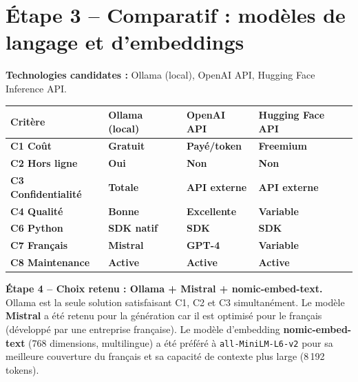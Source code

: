 \documentclass[12pt,a4paper]{report}
\begin{document}
\section{\'{E}tape 3 -- Comparatif : mod\`{e}les de langage et d'embeddings}

\textbf{Technologies candidates :} Ollama (local), OpenAI API, Hugging Face Inference API.

\begin{center}
\renewcommand{\arraystretch}{1.5}
\begin{tabularx}{\linewidth}{>{\bfseries\small}p{2.5cm} X X X}
  \toprule
  \rowcolor{rowblue}
  \textbf{Crit\`{e}re} & \textbf{Ollama (local)} & \textbf{OpenAI API} & \textbf{Hugging Face API} \\
  \midrule
  C1 Co\^{u}t          & \cellcolor{rowgreen}\textbf{Gratuit}     & \cellcolor{rowred}\textbf{Pay\'{e}/token}  & \cellcolor{warnorange!30}\textbf{Freemium} \\
  C2 Hors ligne         & \cellcolor{rowgreen}\textbf{Oui}         & \cellcolor{rowred}\textbf{Non}             & \cellcolor{rowred}\textbf{Non}             \\
  C3 Confidentialit\'{e}& \cellcolor{rowgreen}\textbf{Totale}      & \cellcolor{rowred}\textbf{API externe}     & \cellcolor{rowred}\textbf{API externe}     \\
  C4 Qualit\'{e}        & \cellcolor{warnorange!30}\textbf{Bonne}  & \cellcolor{rowgreen}\textbf{Excellente}    & \cellcolor{warnorange!30}\textbf{Variable} \\
  C6 Python             & \cellcolor{rowgreen}\textbf{SDK natif}   & \cellcolor{rowgreen}\textbf{SDK}           & \cellcolor{rowgreen}\textbf{SDK}           \\
  C7 Fran\c{c}ais       & \cellcolor{rowgreen}\textbf{Mistral}     & \cellcolor{rowgreen}\textbf{GPT-4}         & \cellcolor{warnorange!30}\textbf{Variable} \\
  C8 Maintenance        & \cellcolor{rowgreen}\textbf{Active}      & \cellcolor{rowgreen}\textbf{Active}        & \cellcolor{rowgreen}\textbf{Active}        \\
  \bottomrule
\end{tabularx}
\end{center}

\begin{successbox}
\textbf{\'{E}tape 4 -- Choix retenu : Ollama + Mistral + nomic-embed-text.}
Ollama est la seule solution satisfaisant C1, C2 et C3 simultan\'{e}ment.
Le mod\`{e}le \textbf{Mistral} a \'{e}t\'{e} retenu pour la g\'{e}n\'{e}ration car il est optimis\'{e}
pour le fran\c{c}ais (d\'{e}velopp\'{e} par une entreprise fran\c{c}aise).
Le mod\`{e}le d'embedding \textbf{nomic-embed-text} (768 dimensions, multilingue) a \'{e}t\'{e}
pr\'{e}f\'{e}r\'{e} \`{a} \texttt{all-MiniLM-L6-v2} pour sa meilleure couverture du fran\c{c}ais
et sa capacit\'{e} de contexte plus large (8\,192 tokens).
\end{successbox}
\end{document}
